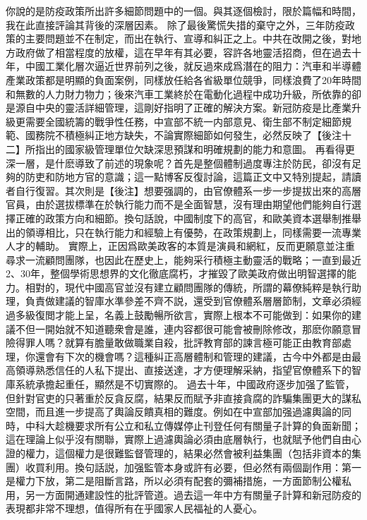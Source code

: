 \documentclass[twocolumn]{ctexart}
\begin{document}
你說的是防疫政策所出許多細節問題中的一個。與其逐個檢討，限於篇幅和時間，我在此直接評論其背後的深層因素。
除了最後驚慌失措的棄守之外，三年防疫政策的主要問題並不在制定，而出在執行、宣導和糾正之上。中共在改開之後，對地方政府做了相當程度的放權，這在早年有其必要，容許各地靈活招商，但在過去十年，中國工業化層次逼近世界前列之後，就反過來成爲潛在的阻力：汽車和半導體產業政策都是明顯的負面案例，同樣放任給各省級單位競爭，同樣浪費了20年時間和無數的人力財力物力；後來汽車工業終於在電動化過程中成功升級，所依靠的卻是源自中央的靈活詳細管理，這剛好指明了正確的解決方案。新冠防疫是比產業升級更需要全國統籌的戰爭性任務，中宣部不統一内部意見、衛生部不制定細節規範、國務院不積極糾正地方缺失，不論實際細節如何發生，必然反映了【後注十二】所指出的國家級管理單位欠缺深思預謀和明確規劃的能力和意圖。
再看得更深一層，是什麽導致了前述的現象呢？首先是整個體制過度專注於防民，卻沒有足夠的防吏和防地方官的意識；這一點博客反復討論，這篇正文中又特別提起，請讀者自行復習。其次則是【後注】想要强調的，由官僚體系一步一步提拔出來的高層官員，由於選拔標準在於執行能力而不是全面智慧，沒有理由期望他們能夠自行選擇正確的政策方向和細節。換句話說，中國制度下的高官，和歐美資本選舉制推舉出的領導相比，只在執行能力和經驗上有優勢，在政策規劃上，同樣需要一流專業人才的輔助。
實際上，正因爲歐美政客的本質是演員和網紅，反而更願意並注重尋求一流顧問團隊，也因此在歷史上，能夠采行積極主動靈活的戰略；一直到最近2、30年，整個學術思想界的文化徹底腐朽，才摧毀了歐美政府做出明智選擇的能力。相對的，現代中國高官並沒有建立顧問團隊的傳統，所謂的幕僚純粹是執行助理，負責做建議的智庫水準參差不齊不説，還受到官僚體系層層節制，文章必須經過多級復閲才能上呈，名義上鼓勵暢所欲言，實際上根本不可能做到：如果你的建議不但一開始就不知道聽衆會是誰，連内容都很可能會被刪除修改，那麽你願意冒險得罪人嗎？就算有膽量敢做職業自殺，批評教育部的諫言極可能正由教育部處理，你還會有下次的機會嗎？這種糾正高層體制和管理的建議，古今中外都是由最高領導熟悉信任的人私下提出、直接送達，才方便理解采納，指望官僚體系下的智庫系統承擔起重任，顯然是不切實際的。
過去十年，中國政府逐步加强了監管，但針對官吏的只著重於反貪反腐，結果反而賦予非直接貪腐的詐騙集團更大的謀私空間，而且進一步提高了輿論反饋真相的難度。例如在中宣部加强過濾輿論的同時，中科大趁機要求所有公立和私立傳媒停止刊登任何有關量子計算的負面新聞；這在理論上似乎沒有關聯，實際上過濾輿論必須由底層執行，也就賦予他們自由心證的權力，這個權力是很難監督管理的，結果必然會被利益集團（包括非資本的集團）收買利用。換句話説，加强監管本身或許有必要，但必然有兩個副作用：第一是權力下放，第二是阻斷言路，所以必須有配套的彌補措施，一方面節制公權私用，另一方面開通建設性的批評管道。過去這一年中方有關量子計算和新冠防疫的表現都非常不理想，值得所有在乎國家人民福祉的人憂心。
\end{document}
